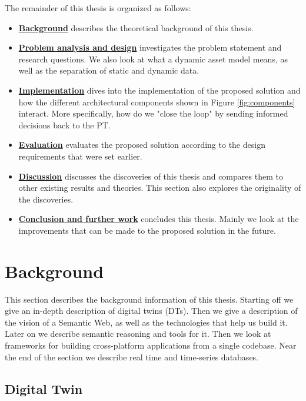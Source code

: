 \documentclass{article}
\begin{document}
The remainder of this thesis is organized as follows:
\begin{itemize}
    \item \hyperref[sec:Background]{\textbf{Background}} describes the theoretical background of this thesis.
    \item \hyperref[sec:Analysis]{\textbf{Problem analysis and design}} investigates the problem statement and research questions. We also look at what a dynamic asset model means, as well as the separation of static and dynamic data.
    \item \hyperref[sec:Implementation]{\textbf{Implementation}} dives into the implementation of the proposed solution and how the different architectural components shown in Figure \ref{fig:components} interact. More specifically, how do we "close the loop" by sending informed decisions back to the PT. 
    \item \hyperref[sec:Evaluation]{\textbf{Evaluation}} evaluates the proposed solution according to the design requirements that were set earlier.
    \item \hyperref[sec:Discussion]{\textbf{Discussion}} discusses the discoveries of this thesis and compares them to other existing results and theories. This section also explores the originality of the discoveries.
    \item \hyperref[sec:Conclusion]{\textbf{Conclusion and further work}} concludes this thesis. Mainly we look at the improvements that can be made to the proposed solution in the future.  
\end{itemize}



\newpage
\section{Background}\label{sec:Background}
This section describes the background information of this thesis. Starting off we give an in-depth description of digital twins (DTs). Then we give a description of the vision of a Semantic Web, as well as the technologies that help us build it. Later on we describe semantic reasoning and tools for it.  Then we look at frameworks for building cross-platform applications from a single codebase. Near the end of the section we describe real time and time-series databases.

\subsection{Digital Twin}\label{subsec:DigitalTwins}
\end{document}
